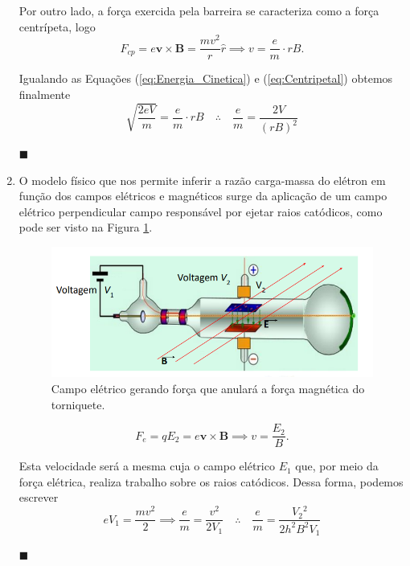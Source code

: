 \documentclass[12pt,a4paper]{article}
\begin{document}
\begin{enumerate}
        Por outro lado, a força exercida pela barreira se caracteriza como a força centrípeta, logo
        \begin{equation} \label{eq:Centripetal}
            F_{cp}=e\boldsymbol{v}\times\boldsymbol{B}=\frac{mv^{2}}{r}\hat{r}\implies v=\frac{e}{m}\cdot rB.
        \end{equation}

        Igualando as Equações (\ref{eq:Energia_Cinetica}) e (\ref{eq:Centripetal}) obtemos finalmente
        \begin{equation} \label{eq:e/m}
            \sqrt{\frac{2eV}{m}}=\frac{e}{m}\cdot rB\quad\therefore\quad\boxed{\frac{e}{m}=\frac{2V}{\left(rB\right)^{2}}}
        \end{equation}
        \begin{flushright}
            $\blacksquare$
        \end{flushright}



        \item O modelo físico que nos permite inferir a razão carga-massa do elétron em função dos campos elétricos e magnéticos surge da aplicação de um campo elétrico perpendicular campo responsável por ejetar raios catódicos, como pode ser visto na Figura \ref{fig:Cathode_Wheel}.
         \begin{figure}[htp!]
        \centering
        \includegraphics[width=0.7\linewidth]{Figures/razao qm com E e B.png}
        \caption{Campo elétrico gerando força que anulará a força magnética do torniquete.}
        \label{fig:Cathode_Wheel}
        \end{figure} 
        
        \begin{equation} \label{eq:Cathode_Wheel}
        F_e=qE_2=e\boldsymbol{v}\times\boldsymbol{B}\implies v=\frac{E_2}{B}.
        \end{equation}
        
        Esta velocidade será a mesma cuja o campo elétrico $E_1$ que, por meio da força elétrica, realiza trabalho sobre os raios catódicos. Dessa forma, podemos escrever
        \begin{equation} \label{eq:Charge-Mass_Ratio}
             e V_1=\frac{m v^{2}}{2}\implies\frac{e}{m}=\frac{v^{2}}{2V_1}\quad\therefore\quad\boxed{\frac{e}{m}=\frac{V_2{^2}}{2h^2B^2V_1}}
        \end{equation}
        \begin{flushright}
            $\blacksquare$
        \end{flushright}
        

\end{enumerate}
\end{document}
